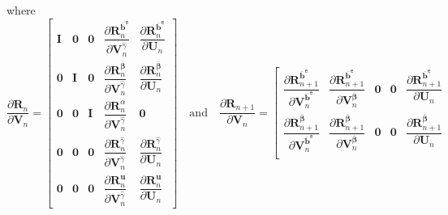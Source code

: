 \documentclass[preprint,11pt]{elsarticle}
\theoremstyle{definition}
\begin{document}
where
\begin{equation*}
    \dfrac{\partial \mathbf{R}_n}{\partial \mathbf{V}_n} = \left[ \begin{array}{ccccc}
        \mathbf{I} & \mathbf{0} & \mathbf{0} & \dfrac{\partial \mathbf{R}_n^{\overline{\mathbf{b}}^\texttt{e}}}{\partial \mathbf{V}_n^{\widehat{\gamma}}} & \dfrac{\partial \mathbf{R}_n^{\overline{\mathbf{b}}^\texttt{e}}}{\partial \mathbf{U}_n} \\[12pt]
        
        \mathbf{0} & \mathbf{I} & \mathbf{0} & \dfrac{\partial \mathbf{R}_n^{\overline{\boldsymbol{\beta}}}}{\partial \mathbf{V}_n^{\widehat{\gamma}}} & \dfrac{\partial \mathbf{R}_n^{\overline{\boldsymbol{\beta}}}}{\partial \mathbf{U}_n} \\[12pt]

        \mathbf{0} & \mathbf{0} & \mathbf{I} & \dfrac{\partial \mathbf{R}_n^\alpha}{\partial \mathbf{V}_n^{\widehat{\gamma}}} & \mathbf{0} \\[12pt]

        \mathbf{0} & \mathbf{0} & \mathbf{0} & \dfrac{\partial \mathbf{R}_n^{\widehat{\gamma}}}{\partial \mathbf{V}_n^{\widehat{\gamma}}} & \dfrac{\partial \mathbf{R}_n^{\widehat{\gamma}}}{\partial \mathbf{U}_n} \\[12pt]

        \mathbf{0} & \mathbf{0} & \mathbf{0} & \dfrac{\partial \mathbf{R}_n^\mathbf{u}}{\partial \mathbf{V}_n^{\widehat{\gamma}}} & \dfrac{\partial \mathbf{R}_n^\mathbf{u}}{\partial \mathbf{U}_n}
    \end{array} \right]
    \quad \text{and} \quad
        \dfrac{\partial \mathbf{R}_{n+1}}{\partial \mathbf{V}_n} = \left[ \begin{array}{ccccc}
        \dfrac{\partial \mathbf{R}_{n+1}^{\overline{\mathbf{b}}^\texttt{e}}}{\partial \mathbf{V}_n^{\overline{\mathbf{b}}^\texttt{e}}} & \dfrac{\partial \mathbf{R}_{n+1}^{\overline{\mathbf{b}}^\texttt{e}}}{\partial \mathbf{V}_n^{\overline{\boldsymbol{\beta}}}} & \mathbf{0} & \mathbf{0} & \dfrac{\partial \mathbf{R}_{n+1}^{\overline{\mathbf{b}}^\texttt{e}}}{\partial \mathbf{U}_n} \\[12pt]
        
        \dfrac{\partial \mathbf{R}_{n+1}^{\overline{\boldsymbol{\beta}}}}{\partial \mathbf{V}_n^{\overline{\mathbf{b}}^\texttt{e}}} & \dfrac{\partial \mathbf{R}_{n+1}^{\overline{\boldsymbol{\beta}}}}{\partial \mathbf{V}_n^{\overline{\boldsymbol{\beta}}}} & \mathbf{0} & \mathbf{0} & \dfrac{\partial \mathbf{R}_{n+1}^{\overline{\boldsymbol{\beta}}}}{\partial \mathbf{U}_n} \\[12pt]


\end{array}
\end{equation*}
\end{document}
